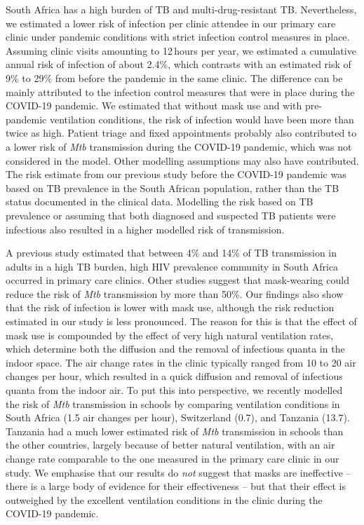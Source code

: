 \documentclass[fleqn,11pt]{wlscirep}
\begin{document}
South Africa has a high burden of TB and multi-drug-resistant TB\cite{WHO2023TBReport}. Nevertheless, we estimated a lower risk of infection per clinic attendee in our primary care clinic under pandemic conditions with strict infection control measures in place. Assuming clinic visits amounting to 12\,hours per year, we estimated a cumulative annual risk of infection of about 2.4\%, which contrasts with an estimated risk of 9\% to 29\% from before the pandemic in the same clinic\cite{Zurcher2022JID}. The difference can be mainly attributed to the infection control measures that were in place during the COVID-19 pandemic. We estimated that without mask use and with pre-pandemic ventilation conditions, the risk of infection would have been more than twice as high. Patient triage and fixed appointments probably also contributed to a lower risk of \emph{Mtb} transmission during the COVID-19 pandemic, which was not considered in the model. Other modelling assumptions may also have contributed. The risk estimate from our previous study before the COVID-19 pandemic\cite{Zurcher2022JID} was based on TB prevalence in the South African population, rather than the TB status documented in the clinical data. Modelling the risk based on TB prevalence or assuming that both diagnosed and suspected TB patients were infectious also resulted in a higher modelled risk of transmission. 

A previous study estimated that between 4\% and 14\% of TB transmission in adults in a high TB burden, high HIV prevalence community in South Africa occurred in primary care clinics\cite{McCreesh2022BMJGlobalHealth}. Other studies suggest that mask-wearing could reduce the risk of \emph{Mtb} transmission by more than 50\%\cite{Dharmadhikari2012AJRCCM,McCreesh2021BMJGlobalHealth}. Our findings also show that the risk of infection is lower with mask use, although the risk reduction estimated in our study is less pronounced. The reason for this is that the effect of mask use is compounded by the effect of very high natural ventilation rates, which determine both the diffusion and the removal of infectious quanta in the indoor space. The air change rates in the clinic typically ranged from 10 to 20 air changes per hour, which resulted in a quick diffusion and removal of infectious quanta from the indoor air. To put this into perspective, we recently modelled the risk of \emph{Mtb} transmission in schools by comparing ventilation conditions in South Africa (1.5 air changes per hour), Switzerland (0.7), and Tanzania (13.7)\cite{Banholzer2024PGPH}. Tanzania had a much lower estimated risk of \emph{Mtb} transmission in schools than the other countries, largely because of better natural ventilation, with an air change rate comparable to the one measured in the primary care clinic in our study. We emphasise that our results do \emph{not} suggest that masks are ineffective -- there is a large body of evidence for their effectiveness -- but that their effect is outweighed by the excellent ventilation conditions in the clinic during the COVID-19 pandemic.
\end{document}
